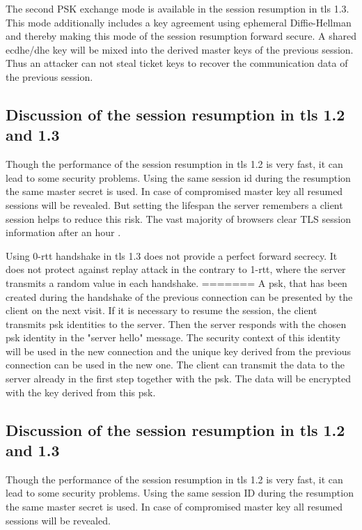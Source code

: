 The second PSK exchange mode is available in the session resumption in \gls{tls} 1.3. This mode additionally includes a key agreement using ephemeral Diffie-Hellman and thereby making this mode of the session resumption forward secure. A shared \gls{ecdhe}/\gls{dhe} key will be mixed into the derived master keys of the previous session. Thus an attacker can not steal ticket keys to recover the communication data of the previous session. \cite{taubert} 

\subsection{Discussion of the session resumption in \gls{tls} 1.2 and 1.3}
\label{subsec:discussion_resumption}
Though the performance of the session resumption in \gls{tls} 1.2 is very fast, it can lead to some security problems. Using the same session id during the resumption the same master secret is used. In case of compromised master key all resumed sessions will be revealed.
But setting the lifespan the server remembers a client session helps to reduce this risk. The vast majority of browsers clear TLS session information after an hour \cite{zdnet}.

Using 0-\gls{rtt} handshake in \gls{tls} 1.3 does not provide a perfect forward secrecy. It does not protect against replay attack in the contrary to 1-\gls{rtt}, where the server transmits a random value in each handshake.
=======
A \gls{psk}, that has been created during the handshake of the previous connection can be presented by the client on the next visit. If it is necessary to resume the session, the client transmits \gls{psk} identities to the server. Then the server responds with the chosen \gls{psk} identity in the "server hello" message. The security context of this identity will be used in the new connection and the unique key derived from the previous connection can be used in the new one. 
The client can transmit the data to the server already in the first step together with the \gls{psk}. The data will be encrypted with the key derived from this \gls{psk}. \cite{ldapwiki:resumption}

\subsection{Discussion of the session resumption in \gls{tls} 1.2 and 1.3}
\label{subsec:discussion_resumption}
Though the performance of the session resumption in \gls{tls} 1.2 is very fast, it can lead to some security problems. Using the same session ID during the resumption the same master secret is used. In case of compromised master key all resumed sessions will be revealed.

